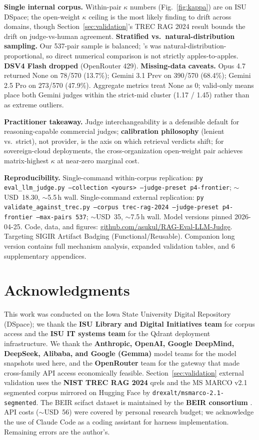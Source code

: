 \documentclass[11pt,letterpaper]{article}
\begin{document}
\textbf{Single internal corpus.} Within-pair $\kappa$ numbers (Fig.~\ref{fig:kappa}) are on ISU DSpace; the open-weight $\kappa$ ceiling is the most likely finding to drift across domains, though Section~\ref{sec:validation}'s TREC RAG 2024 result bounds the drift on judge-vs-human agreement. \textbf{Stratified vs.\ natural-distribution sampling.} Our 537-pair sample is balanced; \citet{thakur2025trecragsupport}'s was natural-distribution-proportional, so direct numerical comparison is not strictly apples-to-apples. \textbf{DSV4 Flash dropped} (OpenRouter 429). \textbf{Missing-data caveats.} Opus 4.7 returned None on 78/570 (13.7\%); Gemini 3.1 Prev on 390/570 (68.4\%); Gemini 2.5 Pro on 273/570 (47.9\%). Aggregate metrics treat None as 0; valid-only means place both Gemini judges within the strict-mid cluster (1.17 / 1.45) rather than as extreme outliers.

\textbf{Practitioner takeaway.} Judge interchangeability is a defensible default for reasoning-capable commercial judges; \textbf{calibration philosophy} (lenient vs.\ strict), not provider, is the axis on which retrieval verdicts shift; for sovereign-cloud deployments, the cross-organization open-weight pair achieves matrix-highest $\kappa$ at near-zero marginal cost.

\textbf{Reproducibility.} Single-command within-corpus replication: \texttt{py eval\_llm\_judge.py --collection <yours> --judge-preset p4-frontier}; $\sim$USD~18.30, $\sim$5.5\,h wall. Single-command external replication: \texttt{py validate\_against\_trec.py --corpus trec-rag-2024 --judge-preset p4-frontier --max-pairs 537}; $\sim$USD~35, $\sim$7.5\,h wall. Model versions pinned 2026-04-25. Code, data, and figures: \href{https://github.com/asukul/RAG-Eval-LLM-Judge}{github.com/asukul/RAG-Eval-LLM-Judge}. Targeting SIGIR Artifact Badging (Functional/Reusable). Companion long version contains full mechanism analysis, expanded validation tables, and 6 supplementary appendices.

\section*{Acknowledgments}

This work was conducted on the Iowa State University Digital Repository (DSpace); we thank the \textbf{ISU Library and Digital Initiatives team} for corpus access and the \textbf{ISU IT systems team} for the Qdrant deployment infrastructure. We thank the \textbf{Anthropic, OpenAI, Google DeepMind, DeepSeek, Alibaba, and Google (Gemma)} model teams for the model snapshots used here, and the \textbf{OpenRouter} team for the gateway that made cross-family API access economically feasible. Section~\ref{sec:validation} external validation uses the \textbf{NIST TREC RAG 2024} qrels \citep{macavaney2025trec_rag} and the MS MARCO v2.1 segmented corpus mirrored on Hugging Face by \texttt{drexalt/msmarco-2.1-segmented}. The BEIR scifact dataset is maintained by the \textbf{BEIR consortium} \citep{thakur2021beir}. API costs ($\sim$USD~56) were covered by personal research budget; we acknowledge the use of Claude Code as a coding assistant for harness implementation. Remaining errors are the author's.



\end{document}
